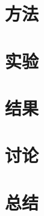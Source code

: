 \documentclass[final,5p]{elsarticle}
\begin{document}

\section{方法} \label{methods}




\section{实验} \label{experiments}




\section{结果} \label{results}




\section{讨论} \label{discussion}




\section{总结} \label{summary}


\end{document}
